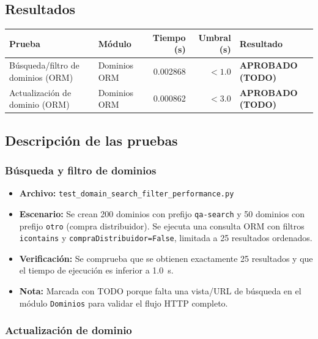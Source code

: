 \documentclass[12pt,a4paper]{article}
\newcommand{\aprobadotodo}{\textcolor{aprobadotodo}{\textbf{APROBADO (TODO)}}}
\begin{document}
\subsection{Resultados}

\begin{center}
\begin{tabularx}{\textwidth}{>{\raggedright}p{3.8cm} >{\raggedright}p{3cm} r r >{\centering\arraybackslash}p{2.5cm}}
\toprule
\textbf{Prueba} & \textbf{Módulo} & \textbf{Tiempo (s)} & \textbf{Umbral (s)} & \textbf{Resultado} \\
\midrule
Búsqueda/filtro de dominios (ORM)
  & Dominios ORM
  & 0.002868
  & $< 1.0$
  & \aprobadotodo \\
Actualización de dominio (ORM)
  & Dominios ORM
  & 0.000862
  & $< 3.0$
  & \aprobadotodo \\
\bottomrule
\end{tabularx}
\end{center}

\subsection{Descripción de las pruebas}

\subsubsection{Búsqueda y filtro de dominios}

\begin{itemize}
  \item \textbf{Archivo:} \texttt{test\_domain\_search\_filter\_performance.py}
  \item \textbf{Escenario:} Se crean 200 dominios con prefijo \texttt{qa-search} y 50 dominios con
        prefijo \texttt{otro} (compra distribuidor). Se ejecuta una consulta ORM con filtros
        \texttt{icontains} y \texttt{compraDistribuidor=False}, limitada a 25 resultados ordenados.
  \item \textbf{Verificación:} Se comprueba que se obtienen exactamente 25 resultados y que el
        tiempo de ejecución es inferior a 1.0~s.
  \item \textbf{Nota:} Marcada con TODO porque falta una vista/URL de búsqueda en el módulo
        \texttt{Dominios} para validar el flujo HTTP completo.
\end{itemize}

\subsubsection{Actualización de dominio}
\end{document}
